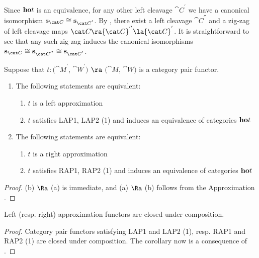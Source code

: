 \begin{rem}
Since ${\bf ho} t$ is an equivalence, for any other left cleavage ${\cat C}^{'}$ we have a canonical isomorphism ${\bf s}_{\cat C} \cong {\bf s}_{{\cat C}^{'}}$. By , there exist a left cleavage ${\cat C}^{''}$ and a zig-zag of left cleavage maps ${\cat C} \ra {\cat C}^{''} \la {\cat C}^{'}$. It is straightforward to see that any such zig-zag induces the canonical isomorphisms ${\bf s}_{\cat C} \cong {\bf s}_{{\cat C}^{''}} \cong {\bf s}_{{\cat C}^{'}}$.
\end{rem}

\begin{cor}
\label{cor:equivleftapprox}
Suppose that $t \colon ({\cat M}^{'}$, ${\cat W}^{'})$ $\ra$ $({\cat M}$, ${\cat W})$ is a category pair functor.
\begin{enumerate}
\item
The following statements are equivalent:
\begin{enumerate}
\item
$t$ is a left approximation
\item
$t$ satisfies LAP1, LAP2 (1) and induces an equivalence of categories ${\bf ho}t$
\end{enumerate}
\item
The following statements are equivalent:
\begin{enumerate}
\item
$t$ is a right approximation
\item
$t$ satisfies RAP1, RAP2 (1) and induces an equivalence of categories ${\bf ho}t$
\end{enumerate}
\end{enumerate}
\end{cor}

\begin{proof}
(b) $\Ra$ (a) is immediate, and (a) $\Ra$ (b) follows from the Approximation .
\end{proof}

\begin{cor}
\label{cor:otherleftapprox}
Left (resp. right) approximation functors are closed under composition.
\end{cor}

\begin{proof}
Category pair functors satisfying LAP1 and LAP2 (1), resp. RAP1 and RAP2 (1) are closed under composition. The corollary now is a consequence of .
\end{proof}

